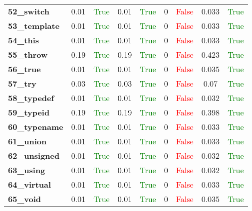 \documentclass{article}
\begin{document}
\begin{xltabular}{\textwidth}{lcccccccc}
\textbf{52\_switch}& 0.01&\textcolor{green}{True}& 0.01&\textcolor{green}{True}& 0&\textcolor{red}{False}& 0.033&\textcolor{green}{True} \\[0.5ex]
\textbf{53\_template}& 0.01&\textcolor{green}{True}& 0.01&\textcolor{green}{True}& 0&\textcolor{red}{False}& 0.033&\textcolor{green}{True} \\[0.5ex]
\textbf{54\_this}& 0.01&\textcolor{green}{True}& 0.01&\textcolor{green}{True}& 0&\textcolor{red}{False}& 0.033&\textcolor{green}{True} \\[0.5ex]
\textbf{55\_throw}& 0.19&\textcolor{green}{True}& 0.19&\textcolor{green}{True}& 0&\textcolor{red}{False}& 0.423&\textcolor{green}{True} \\[0.5ex]
\textbf{56\_true}& 0.01&\textcolor{green}{True}& 0.01&\textcolor{green}{True}& 0&\textcolor{red}{False}& 0.035&\textcolor{green}{True} \\[0.5ex]
\textbf{57\_try}& 0.03&\textcolor{green}{True}& 0.03&\textcolor{green}{True}& 0&\textcolor{red}{False}& 0.07&\textcolor{green}{True} \\[0.5ex]
\textbf{58\_typedef}& 0.01&\textcolor{green}{True}& 0.01&\textcolor{green}{True}& 0&\textcolor{red}{False}& 0.032&\textcolor{green}{True} \\[0.5ex]
\textbf{59\_typeid}& 0.19&\textcolor{green}{True}& 0.19&\textcolor{green}{True}& 0&\textcolor{red}{False}& 0.398&\textcolor{green}{True} \\[0.5ex]
\textbf{60\_typename}& 0.01&\textcolor{green}{True}& 0.01&\textcolor{green}{True}& 0&\textcolor{red}{False}& 0.033&\textcolor{green}{True} \\[0.5ex]
\textbf{61\_union}& 0.01&\textcolor{green}{True}& 0.01&\textcolor{green}{True}& 0&\textcolor{red}{False}& 0.033&\textcolor{green}{True} \\[0.5ex]
\textbf{62\_unsigned}& 0.01&\textcolor{green}{True}& 0.01&\textcolor{green}{True}& 0&\textcolor{red}{False}& 0.032&\textcolor{green}{True} \\[0.5ex]
\textbf{63\_using}& 0.01&\textcolor{green}{True}& 0.01&\textcolor{green}{True}& 0&\textcolor{red}{False}& 0.032&\textcolor{green}{True} \\[0.5ex]
\textbf{64\_virtual}& 0.01&\textcolor{green}{True}& 0.01&\textcolor{green}{True}& 0&\textcolor{red}{False}& 0.033&\textcolor{green}{True} \\[0.5ex]
\textbf{65\_void}& 0.01&\textcolor{green}{True}& 0.01&\textcolor{green}{True}& 0&\textcolor{red}{False}& 0.035&\textcolor{green}{True} \\[0.5ex]

\end{xltabular}
\end{document}
